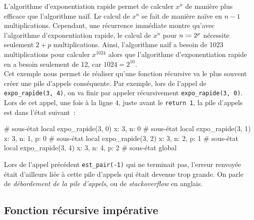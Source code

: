 \documentclass{magnolia}
\begin{document}
\noindent
L'algorithme d'exponentiation rapide permet de calculer $x^n$ de manière plus efficace
que l'algorithme naïf. Le calcul de $x^n$ se fait de manière naïve en $n-1$ multiplications.
Cependant, une récurrence immédiate montre qu'avec l'algorithme d'exponentiation rapide,
le calcul de $x^n$ pour $n\coloneqq 2^p$ nécessite seulement $2+p$ multiplications.
Ainsi, l'algorithme naïf a besoin de 1023 multiplications pour calculer $x^{1024}$ alors
que l'algorithme d'exponentiation rapide en a besoin seulement de 12, car $1024=2^{10}$.\\

Cet exemple nous permet de réaliser qu'une fonction récursive va le plus souvent
créer une pile d'appels conséquente. Par exemple, lors de l'appel
de \verb!expo_rapide(3, 4)!, on va finir par appeler récursivement
\verb!expo_rapide(3, 0)!. Lors de cet appel, une fois à la ligne 4, juste avant
le \verb!return 1!, la pile d'appels est dans l'état suivant~:

\begin{pythoncode}
# sous-état local expo_rapide(3, 0)  {x: 3, n: 0}
# sous-état local expo_rapide(3, 1)  {x: 3, n: 1, p: 0}
# sous-état local expo_rapide(3, 2)  {x: 3, n: 2, p: 1}
# sous-état local expo_rapide(3, 4)  {x: 3, n: 4, p: 2}
# sous-état global                   {}
\end{pythoncode}
\noindent Lors de l'appel précédent \verb!est_pair(-1)! qui ne terminait pas, l'erreur renvoyée était d'ailleurs
liée à cette pile d'appels qui était devenue trop grande. On parle de \emph{débordement
de la pile d'appels}, ou de \emph{stackoverflow} en anglais.


\subsection{Fonction récursive impérative}
\end{document}

